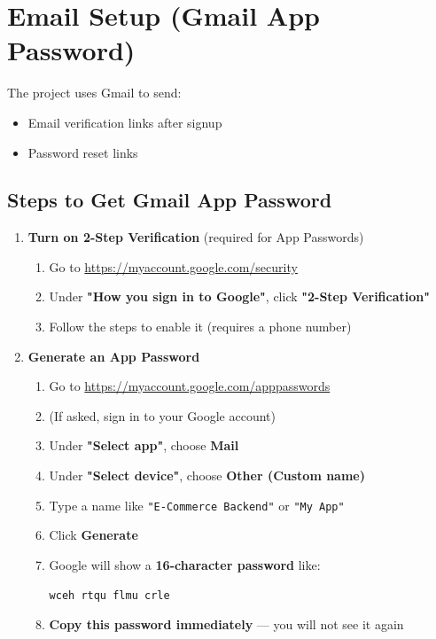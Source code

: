 \documentclass[12pt,a4paper]{article}
\begin{document}
\newpage

\section{Email Setup (Gmail App Password)}

The project uses Gmail to send:
\begin{itemize}
    \item Email verification links after signup
    \item Password reset links
\end{itemize}

\subsection{Steps to Get Gmail App Password}

\begin{enumerate}[leftmargin=*,itemsep=0.7em]
    \item \textbf{Turn on 2-Step Verification} (required for App Passwords)
    \begin{enumerate}
        \item Go to \url{https://myaccount.google.com/security}
        \item Under \textbf{"How you sign in to Google"}, click \textbf{"2-Step Verification"}
        \item Follow the steps to enable it (requires a phone number)
    \end{enumerate}
    
    \item \textbf{Generate an App Password}
    \begin{enumerate}
        \item Go to \url{https://myaccount.google.com/apppasswords}
        \item (If asked, sign in to your Google account)
        \item Under \textbf{"Select app"}, choose \textbf{Mail}
        \item Under \textbf{"Select device"}, choose \textbf{Other (Custom name)}
        \item Type a name like \texttt{"E-Commerce Backend"} or \texttt{"My App"}
        \item Click \textbf{Generate}
        \item Google will show a \textbf{16-character password} like:
        
        \begin{tcolorbox}[colback=yellow!10!white,colframe=warnyellow,title=Example App Password]
            \centering
            \Large\texttt{wceh rtqu flmu crle}
        \end{tcolorbox}
        
        \item \textbf{Copy this password immediately} — you will not see it again
    \end{enumerate}
\end{enumerate}
\end{document}
